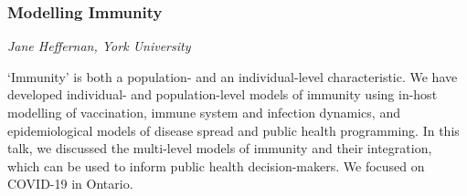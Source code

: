 \subsubsection*{Modelling Immunity}
\textit{Jane Heffernan, York University}

`Immunity' is both a population- and an individual-level characteristic. We have developed individual- and population-level models of immunity using in-host modelling of vaccination, immune system and infection dynamics, and epidemiological models of disease spread and public health programming. In this talk, we discussed the multi-level models of immunity and their integration, which can be used to inform public health decision-makers. We focused on COVID-19 in Ontario.

